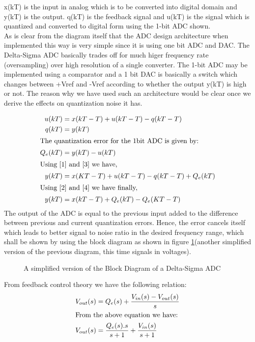 \documentclass[colorlinks=true,pdfstartview=FitV,linkcolor=blue,
            citecolor=red,urlcolor=magenta]{ligodoc}
\begin{document}
x(kT) is the input in analog which is to be converted into digital domain and y(kT) is the output. q(kT) is the feedback signal and u(kT) is the signal which is quantized and converted to digital form using the 1-bit ADC shown.\\
As is clear from the diagram itself that the ADC design architecture when implemented this way is very simple since it is using one bit ADC and DAC. The Delta-Sigma ADC basically trades off for much higer frequency rate (oversampling) over high resolution of a single converter. The 1-bit ADC may be implemented using a comparator and a 1 bit DAC is basically a switch which changes between +Vref and -Vref according to whether the output y(kT) is high or not. The reason why we have used such an architecture would be clear once we derive the effects on quantization noise it has.

\begin{align} 
u(kT)& = x(kT-T)+u(kT-T)-q(kT-T) \label{1}\\
q(kT)& = y(kT) \label{2}\\
\intertext{The quantization error for the 1bit ADC is given by:}
Q_{e}(kT)& = y(kT)-u(kT) \label{3}\\
\intertext{Using \ref{1} and \ref{3} we have,}
y(kT)& =x(KT-T)+u(kT-T)-q(kT-T)+Q_{e}(kT) \label{4}\\
\intertext{Using \ref{2} and \ref{4} we have finally,}
y(kT)& =x(kT-T)+Q_{e}(kT)-Q_{e}(KT-T)
\end{align}
The output of the ADC is equal to the previous input added to the difference between previous and current quantization errors. Hence, the error cancels itself which leads to better signal to noise ratio in the desired frequency range, which shall be shown by using the block diagram as shown in figure \ref{simple}(another simplified version of the previous diagram, this time signals in voltages).
\begin{figure}[htbp]
 
  \centering
  
  \caption{A simplified version of the Block Diagram of a Delta-Sigma ADC}
 \label{simple}
\end{figure}
From feedback control theory we have the following relation:
\begin{align}
V_{out}(s)&=Q_{e}(s)+\frac{V_{in}(s)-V_{out}(s)}{s}\\
\intertext{From the above equation we have:}
V_{out}(s)&=\frac{Q_{e}(s).s}{s+1} + \frac{V_{in}(s)}{s+1}
\end{align}
\end{document}
